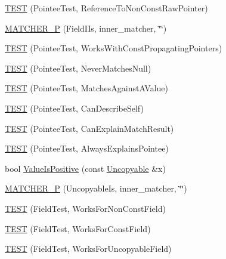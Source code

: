 \begin{DoxyCompactItemize}
\item 
\hyperlink{namespacetesting_1_1gmock__matchers__test_a2d2296f6b23130be225b8df48746dfd5}{T\+E\+ST} (Pointee\+Test, Reference\+To\+Non\+Const\+Raw\+Pointer)
\item 
\hyperlink{namespacetesting_1_1gmock__matchers__test_a3d3f285bba1766bf9daf840a16e79924}{M\+A\+T\+C\+H\+E\+R\+\_\+P} (Field\+I\+Is, inner\+\_\+matcher, \char`\"{}\char`\"{})
\item 
\hyperlink{namespacetesting_1_1gmock__matchers__test_a9d851a5bb597fa45b5d1cf3f295398e8}{T\+E\+ST} (Pointee\+Test, Works\+With\+Const\+Propagating\+Pointers)
\item 
\hyperlink{namespacetesting_1_1gmock__matchers__test_ac778a9cebf9306a5efd27cc1186d8269}{T\+E\+ST} (Pointee\+Test, Never\+Matches\+Null)
\item 
\hyperlink{namespacetesting_1_1gmock__matchers__test_afe22e8230dc7a34498e4b2f91dcdd7cd}{T\+E\+ST} (Pointee\+Test, Matches\+Against\+A\+Value)
\item 
\hyperlink{namespacetesting_1_1gmock__matchers__test_ac8b9baa938635d587f0b0df1073208e2}{T\+E\+ST} (Pointee\+Test, Can\+Describe\+Self)
\item 
\hyperlink{namespacetesting_1_1gmock__matchers__test_a263ede06f6b32a625bb40e4f4c58c8dc}{T\+E\+ST} (Pointee\+Test, Can\+Explain\+Match\+Result)
\item 
\hyperlink{namespacetesting_1_1gmock__matchers__test_a00128de027ff6f49f82a7011dd346d43}{T\+E\+ST} (Pointee\+Test, Always\+Explains\+Pointee)
\item 
bool \hyperlink{namespacetesting_1_1gmock__matchers__test_a7c429b4fa8a7835724d9e28033e908b2}{Value\+Is\+Positive} (const \hyperlink{classtesting_1_1gmock__matchers__test_1_1_uncopyable}{Uncopyable} \&x)
\item 
\hyperlink{namespacetesting_1_1gmock__matchers__test_a55a8eba9beb33753baf7690d4cb9cd7e}{M\+A\+T\+C\+H\+E\+R\+\_\+P} (Uncopyable\+Is, inner\+\_\+matcher, \char`\"{}\char`\"{})
\item 
\hyperlink{namespacetesting_1_1gmock__matchers__test_a57213a63527bbd66c024dd1cfafe92d1}{T\+E\+ST} (Field\+Test, Works\+For\+Non\+Const\+Field)
\item 
\hyperlink{namespacetesting_1_1gmock__matchers__test_a065efc397a420d3dde87909b4a9a6285}{T\+E\+ST} (Field\+Test, Works\+For\+Const\+Field)
\item 
\hyperlink{namespacetesting_1_1gmock__matchers__test_ac26d681f09865b0727ca32343d974907}{T\+E\+ST} (Field\+Test, Works\+For\+Uncopyable\+Field)
\item 

\end{DoxyCompactItemize}
